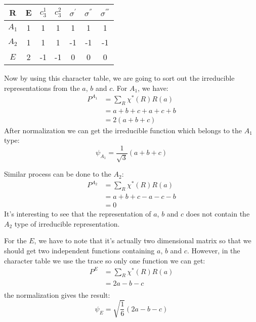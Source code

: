 \begin{center}
  \begin{tabular}{ c|c c c c c c }
    \hline
    R   & E & $c^{1}_{3}$ & $c^{2}_{3}$ & $\sigma^{'}$
    & $\sigma^{''}$ & $\sigma^{'''}$ \\
    \hline
    $A_{1}$ & 1 & 1 & 1 & 1  & 1  & 1  \\
    $A_{2}$ & 1 & 1 & 1 & -1 & -1 & -1 \\
    $E$     & 2 &-1 &-1 & 0  & 0  & 0  \\
  \end{tabular}
\end{center}
Now by using this character table, we are going to sort out the
irreducible representations from the $a$, $b$ and $c$. For $A_{1}$, we
have:
\begin{align}\label{}
  P^{A_{1}} &= \sum_{R}\chi^{*}(R)R(a) \nonumber \\
  &=a + b + c + a + c + b \nonumber \\
  &=2(a+b+c)
\end{align}
After normalization we can get the irreducible function which belongs
to the $A_{1}$ type:
\begin{equation}\label{}
  \psi_{A_{1}} = \frac{1}{\sqrt{3}}(a+b+c)
\end{equation}

Similar process can be done to the $A_{2}$:
\begin{align}\label{}
  P^{A_{2}} &= \sum_{R}\chi^{*}(R)R(a) \nonumber \\
  &=a + b + c - a - c - b \nonumber \\
  &=0
\end{align}
It's interesting to see that the representation of $a$, $b$ and $c$
does not contain the $A_{2}$ type of irreducible representation.

For the $E$, we have to note that it's actually two dimensional matrix
so that we should get two independent functions containing $a$, $b$
and $c$. However, in the character table we use the trace so only one
function we can get:
\begin{align}\label{}
  P^{E} &= \sum_{R}\chi^{*}(R)R(a) \nonumber \\
  &=2a - b - c\nonumber \\
\end{align}
the normalization gives the result:
\begin{equation}\label{}
  \psi_{E} = \sqrt{\frac{1}{6}}(2a-b-c)
\end{equation}

